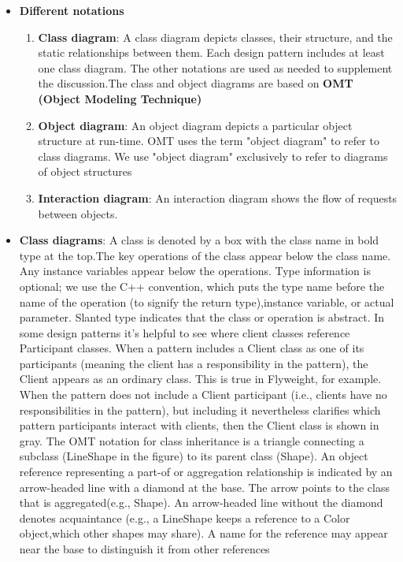 \documentclass{report}
\begin{document}
    \begin{itemize}
        \item \textbf{Different notations}        
            \begin{enumerate}
                \item \textbf{Class diagram}: A class diagram depicts classes, their structure, and the static relationships between them.
                    \bigbreak \noindent 
                    Each design pattern includes at least one class diagram. The other notations are used as needed to supplement the discussion.The class and object diagrams are based on \textbf{OMT (Object Modeling Technique)}
                \item \textbf{Object diagram}: An object diagram depicts a particular object structure at run-time.
                    \bigbreak \noindent 
                    OMT uses the term "object diagram" to refer to class diagrams. We use "object diagram" exclusively to refer to diagrams of object structures
                \item \textbf{Interaction diagram}: An interaction diagram shows the flow of requests between objects. 
            \end{enumerate}
        \item \textbf{Class diagrams}: A class is denoted by a box with the class name in bold type at the top.The key operations of the class appear below the class name. Any instance variables appear below the operations. Type information is optional; we use the C++ convention, which puts the type name before the name of the operation (to signify the return type),instance variable, or actual parameter. Slanted type indicates that the class or operation is abstract. 
            \bigbreak \noindent 
            \bigbreak \noindent 
            In some design patterns it's helpful to see where client classes reference Participant classes. When a pattern includes a Client class as one of its participants (meaning the client has a responsibility in the pattern), the Client appears as an ordinary class. This is true in Flyweight, for example. When the pattern does not include a Client participant (i.e., clients have no responsibilities in the pattern), but including it nevertheless clarifies which pattern participants interact with clients, then the Client class is shown in gray.
            \bigbreak \noindent 
            \bigbreak \noindent 
            The OMT notation for class inheritance is a triangle connecting a subclass (LineShape in the figure) to its parent class (Shape). An object reference representing a part-of or aggregation relationship is indicated by an arrow-headed line with a diamond at the base. The arrow points to the class that is aggregated(e.g., Shape). An arrow-headed line without the diamond denotes acquaintance (e.g., a LineShape keeps a reference to a Color object,which other shapes may share). A name for the reference may appear near the base to distinguish it from other references

\end{itemize}
\end{document}
